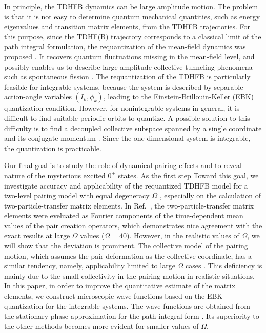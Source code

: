 \documentclass[%
superscriptaddress,
preprint,
showpacs,
nofootinbib,
amsmath,amssymb,
prc,
floatfix ]%
{revtex4-1}
\begin{document}
In principle, the TDHFB dynamics can be large amplitude motion.
The problem is that it is not easy to determine quantum mechanical 
quantities, such as energy eigenvalues and transition matrix elements,
from the TDHFB trajectories.
For this purpose,
since the TDHF(B) trajectory corresponds to a classical limit of the path
integral formulation,
the requantization of the mean-field dynamics was
proposed \cite{Neg80,path,path2,Rei80}.
It recovers quantum fluctuations missing in the mean-field
level, and possibly enables us to describe large-amplitude collective
tunneling phenomena such as spontaneous fission \cite{Neg80}.
The requantization of the TDHFB is particularly feasible
for integrable systems, because the system is described by separable
action-angle variables $(I_k, \phi_k)$, leading to
the Einstein-Brillouin-Keller (EBK) quantization condition.
However, for nonintegrable systems in general, it is difficult to find
suitable periodic orbits to quantize.
A possible solution to this difficulty is to find a decoupled collective
subspace spanned by
a single coordinate and its conjugate momentum \cite{NMMY16}.
Since the one-dimensional system is integrable, the quantization is
practicable.

Our final goal is to study the role of dynamical pairing effects
and to reveal nature of the mysterious excited $0^+$ states.
As the first step Toward this goal, we investigate accuracy and
applicability of the requantized TDHFB model for a two-level pairing model
with equal degeneracy $\Omega$ \cite{HF60},
especially on the calculation of two-particle-transfer matrix elements.
In Ref.~\cite{CDS84},
the two-particle-transfer matrix elements were eveluated as
Fourier components of the time-dependent mean values of the pair
creation operators,
which demonstrates nice agreement with the exact results at
large $\Omega$ values ($\Omega=40$).
However, in the realistic values of $\Omega$, we will show that
the deviation is prominent.
The collective model of the pairing motion, which assumes the pair deformation
as the collective coordinate, has a similar tendency, namely, 
applicability limited to large $\Omega$ cases \cite{BBPK70}.
This deficiency is mainly due to the small collectivity in the pairing motion
in realistic situations.
In this paper, in order to improve the quantitative estimate of the matrix
elements, we construct microscopic wave functions
based on the EBK quantization for the integrable systems.
The wave functions are obtained
from the stationary phase approximation for the path-integral form \cite{SM88}.
Its superiority to the other methods
becomes more evident for smaller values of $\Omega$.
\end{document}

